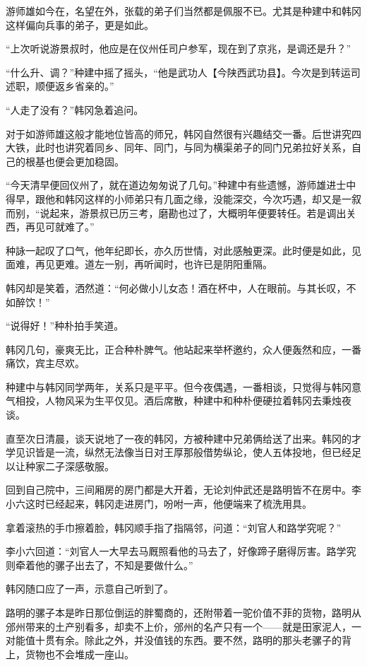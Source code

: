 游师雄如今在，名望在外，张载的弟子们当然都是佩服不已。尤其是种建中和韩冈这样偏向兵事的弟子，更是如此。

“上次听说游景叔时，他应是在仪州任司户参军，现在到了京兆，是调还是升？”

“什么升、调？”种建中摇了摇头，“他是武功人【今陕西武功县】。今次是到转运司述职，顺便返乡省亲的。”

“人走了没有？”韩冈急着追问。

对于如游师雄这般才能地位皆高的师兄，韩冈自然很有兴趣结交一番。后世讲究四大铁，此时也讲究着同乡、同年、同门，与同为横渠弟子的同门兄弟拉好关系，自己的根基也便会更加稳固。

“今天清早便回仪州了，就在道边匆匆说了几句。”种建中有些遗憾，游师雄进士中得早，跟他和韩冈这样的小师弟只有几面之缘，没能深交，今次巧遇，却又是一叙而别，“说起来，游景叔已历三考，磨勘也过了，大概明年便要转任。若是调出关西，再见可就难了。”

种詠一起叹了口气，他年纪即长，亦久历世情，对此感触更深。此时便是如此，见面难，再见更难。道左一别，再听闻时，也许已是阴阳重隔。

韩冈却是笑着，洒然道：“何必做小儿女态！酒在杯中，人在眼前。与其长叹，不如醉饮！”

“说得好！”种朴拍手笑道。

韩冈几句，豪爽无比，正合种朴脾气。他站起来举杯邀约，众人便轰然和应，一番痛饮，宾主尽欢。

种建中与韩冈同学两年，关系只是平平。但今夜偶遇，一番相谈，只觉得与韩冈意气相投，人物风采为生平仅见。酒后席散，种建中和种朴便硬拉着韩冈去秉烛夜谈。

直至次日清晨，谈天说地了一夜的韩冈，方被种建中兄弟俩给送了出来。韩冈的才学见识皆是一流，纵然无法像当日对王厚那般借势纵论，使人五体投地，但已经足以让种家二子深感敬服。

回到自己院中，三间厢房的房门都是大开着，无论刘仲武还是路明皆不在房中。李小六这时已经起来，韩冈走进房门，吩咐一声，他便端来了梳洗用具。

拿着滚热的手巾擦着脸，韩冈顺手指了指隔邻，问道：“刘官人和路学究呢？”

李小六回道：“刘官人一大早去马厩照看他的马去了，好像蹄子磨得厉害。路学究则牵着他的骡子出去了，不知是要做什么。”

韩冈随口应了一声，示意自己听到了。

路明的骡子本是昨日那位倒运的胖蜀商的，还附带着一驼价值不菲的货物，路明从邠州带来的土产别看多，却卖不上价，邠州的名产只有一个——就是田家泥人，一对能值十贯有余。除此之外，并没值钱的东西。要不然，路明的那头老骡子的背上，货物也不会堆成一座山。

